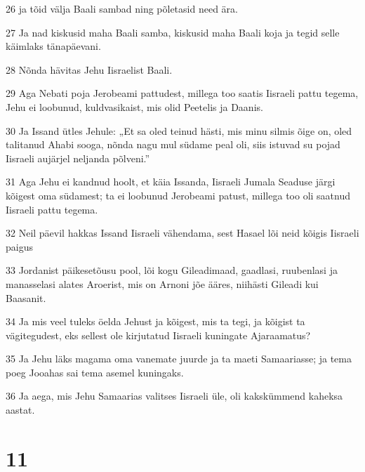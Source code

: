 \par 26 ja tõid välja Baali sambad ning põletasid need ära.
\par 27 Ja nad kiskusid maha Baali samba, kiskusid maha Baali koja ja tegid selle käimlaks tänapäevani.
\par 28 Nõnda hävitas Jehu Iisraelist Baali.
\par 29 Aga Nebati poja Jerobeami pattudest, millega too saatis Iisraeli pattu tegema, Jehu ei loobunud, kuldvasikaist, mis olid Peetelis ja Daanis.
\par 30 Ja Issand ütles Jehule: „Et sa oled teinud hästi, mis minu silmis õige on, oled talitanud Ahabi sooga, nõnda nagu mul südame peal oli, siis istuvad su pojad Iisraeli aujärjel neljanda põlveni.”
\par 31 Aga Jehu ei kandnud hoolt, et käia Issanda, Iisraeli Jumala Seaduse järgi kõigest oma südamest; ta ei loobunud Jerobeami patust, millega too oli saatnud Iisraeli pattu tegema.
\par 32 Neil päevil hakkas Issand Iisraeli vähendama, sest Hasael lõi neid kõigis Iisraeli paigus
\par 33 Jordanist päikesetõusu pool, lõi kogu Gileadimaad, gaadlasi, ruubenlasi ja manasselasi alates Aroerist, mis on Arnoni jõe ääres, niihästi Gileadi kui Baasanit.
\par 34 Ja mis veel tuleks öelda Jehust ja kõigest, mis ta tegi, ja kõigist ta vägitegudest, eks sellest ole kirjutatud Iisraeli kuningate Ajaraamatus?
\par 35 Ja Jehu läks magama oma vanemate juurde ja ta maeti Samaariasse; ja tema poeg Jooahas sai tema asemel kuningaks.
\par 36 Ja aega, mis Jehu Samaarias valitses Iisraeli üle, oli kakskümmend kaheksa aastat.

\chapter{11}

